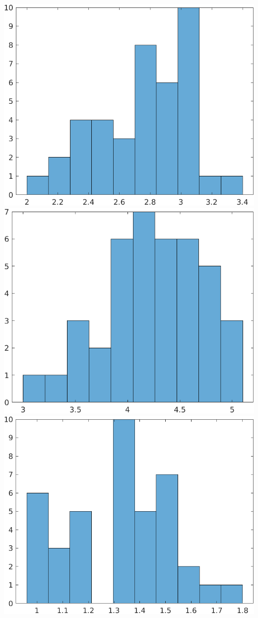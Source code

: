 \documentclass[a4paper]{scrartcl}
\begin{document}
\begin{itemize}
		\includegraphics*[scale=0.2]{assignment2_data/plots/versicolor_sb.png}
		\includegraphics*[scale=0.2]{assignment2_data/plots/versicolor_pl.png}
		\includegraphics*[scale=0.2]{assignment2_data/plots/versicolor_pb.png}\ \\
		

\end{itemize}
\end{document}
